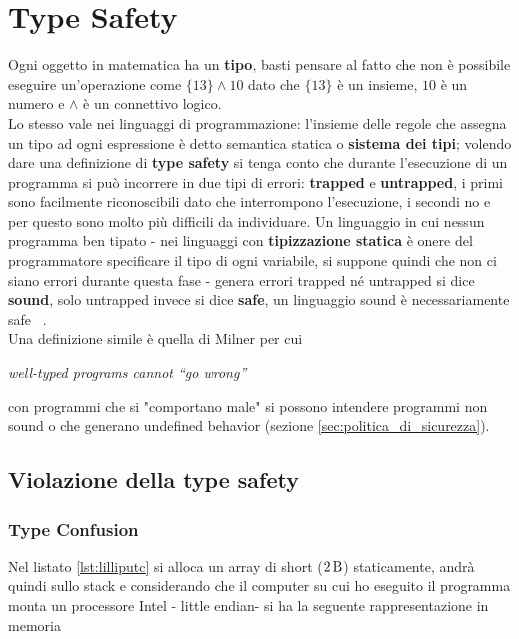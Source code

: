 \documentclass{report}
\begin{document}



\clearpage
\chapter{Type Safety} \label{chap:type_safety}
Ogni oggetto in matematica ha un \textbf{tipo}, basti pensare al fatto che non è possibile eseguire un'operazione come $ \{13\} \land 10 $ dato che $\{13\}$ è un insieme, $10$ è un numero e $\land$ è un connettivo logico.\\
 Lo stesso vale nei linguaggi di programmazione: l'insieme delle regole che assegna un tipo ad ogni espressione è detto semantica statica o \textbf{sistema dei tipi}; volendo dare una definizione di \textbf{type safety} si tenga conto che durante l'esecuzione di un programma si può incorrere in due tipi di errori: \textbf{trapped} e \textbf{untrapped}, i primi sono facilmente riconoscibili dato che interrompono l'esecuzione, i secondi no e per questo sono molto più difficili da individuare. Un linguaggio in cui nessun programma ben tipato - nei linguaggi con \textbf{tipizzazione statica} è onere del programmatore specificare il tipo di ogni variabile, si suppone quindi che non ci siano errori durante questa fase - genera errori trapped né untrapped si dice \textbf{sound}, solo untrapped invece si dice \textbf{safe}, un linguaggio sound è necessariamente safe ~\cite{cencia:dispense}.\\ 
 Una definizione simile è quella di Milner per cui 
 \begin{center}
    \textit{well-typed programs cannot “go wrong”} ~\cite{milner:type_polymorphism}
 \end{center}
 con programmi che si "comportano male" si possono intendere programmi non sound o che generano undefined behavior (sezione \ref{sec:politica_di_sicurezza}). 

\section{Violazione della type safety}
\subsection{Type Confusion} \label{sec:type_confusion}
Nel listato \ref{lst:lilliputc} si alloca un array di short ($\SI{2}{\byte} $) staticamente, andrà quindi sullo stack e considerando che il computer su cui ho eseguito il programma monta un processore Intel - little endian- si ha la seguente rappresentazione in memoria
\end{document}
